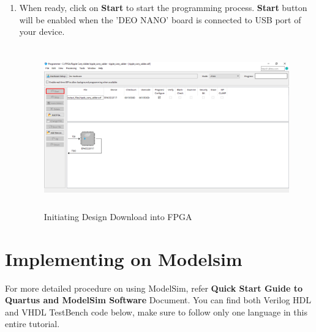 \documentclass[12pt,singleside,a4paper]{article}
\begin{document}
\begin{enumerate}
     \item When ready, click on \textbf{Start} to start the programming process. \textbf{Start} button will be enabled when the 'DEO NANO' board is connected to USB port of your device. 
     \begin{figure}[H]
         \centering
         \includegraphics[height=7cm,keepaspectratio]{img21.png}
     \caption{Initiating Design Download into FPGA}
     \end{figure}
     
 \end{enumerate}
\newpage
\section{Implementing on Modelsim }
For more detailed procedure on using ModelSim, refer \textbf{Quick Start Guide to Quartus and ModelSim Software} Document. You can find both Verilog HDL and VHDL TestBench code below, make sure to follow only one language in this entire tutorial.
\end{document}
